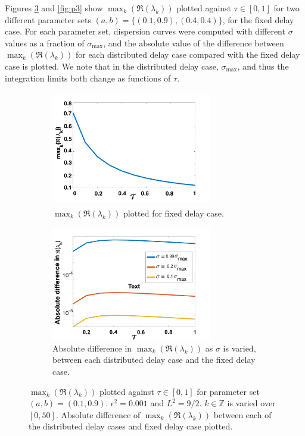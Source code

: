 Figures \ref{fig:p2} and \ref{fig:p3} show $\max_k(\Re(\lambda_k))$ plotted against $\tau\in[0,1]$ for two different parameter sets $(a,b)=\{(0.1,0.9), (0.4,0.4)\}$, for the fixed delay case. For each parameter set, dispersion curves were computed with different $\sigma$ values as a fraction of $\sigma_{\max}$, and the absolute value of the difference between $\max_k(\Re(\lambda_k))$ for each distributed delay case compared with the fixed delay case is plotted. We note that in the distributed delay case,  $\sigma_{\max}$, and thus the integration limits both change as functions of $\tau$.

\begin{figure}[H]
    \centering
    \begin{subfigure}[t]{0.45\textwidth}
        \centering
        \includegraphics[width=7cm,height=5cm]{p2fixed.png}
        \caption{$\max_k(\Re(\lambda_k))$ plotted for fixed delay case.}
        \label{}
    \end{subfigure}
    \hfill
    \begin{subfigure}[t]{0.45\textwidth}
        \centering
        \includegraphics[width=7cm,height=5cm]{dispdiff1.png}
        \caption{Absolute difference in $\max_k(\Re(\lambda_k))$ as $\sigma$ is varied, between each distributed delay case and the fixed delay case.}
        \label{}
    \end{subfigure}
    \caption{$\max_k(\Re(\lambda_k))$ plotted against $\tau\in[0,1]$ for parameter set $(a,b)=(0.1,0.9)$. $\epsilon^2=0.001$ and $L^2=9/2$. $k\in\mathbb{Z}$ is varied over $[0,50]$. Absolute difference of $\max_k(\Re(\lambda_k))$ between each of the distributed delay cases and fixed delay case plotted.}
    \label{fig:p2}
\end{figure}
